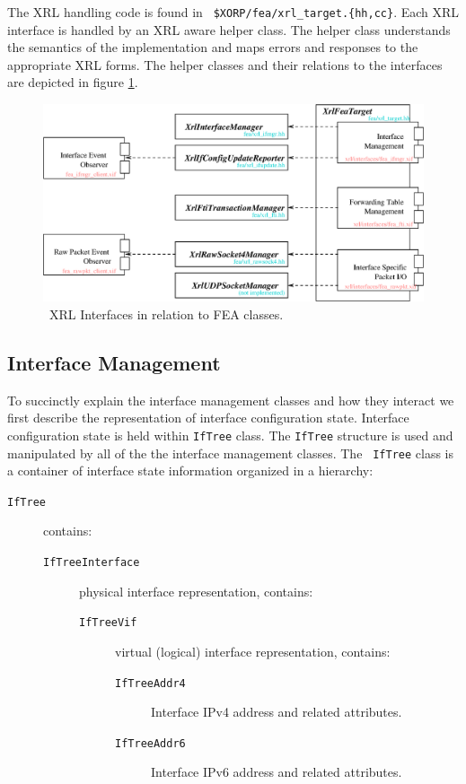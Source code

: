 \documentclass[11pt]{article}
\begin{document}
The XRL handling code is found in {\tt
\$XORP/fea/xrl\_target.\{hh,cc\}}.  Each XRL interface is handled by
an XRL aware helper class.  The helper class understands the semantics
of the implementation and maps errors and responses to the appropriate
XRL forms.  The helper classes and their relations to the interfaces
are depicted in figure \ref{fig:xrl_ifs}.

\clearpage
\begin{figure}
\includegraphics[width=\textheight]{figs/xrl_ifs}
\caption{\label{fig:xrl_ifs} \
XRL Interfaces in relation to FEA classes.
}
\end{figure}
\clearpage
\subsection{Interface Management}

To succinctly explain the interface management classes and how they
interact we first describe the representation of interface
configuration state.  Interface configuration state is held within
{\tt IfTree} class.  The {\tt IfTree} structure is used and
manipulated by all of the the interface management classes.  The {\tt
IfTree} class is a container of interface state information organized
in a hierarchy:

\begin{description}
\item [\tt IfTree] contains:
  \begin{description}
  \item [\tt IfTreeInterface] physical interface representation, contains:
    \begin{description}
    \item [\tt IfTreeVif] virtual (logical) interface representation, contains:
      \begin{description}
      \item [\tt IfTreeAddr4] Interface IPv4 address and related attributes.
      \item [\tt IfTreeAddr6] Interface IPv6 address and related attributes.
      \end{description}
    \end{description}
  \end{description}
\end{description}
\end{document}
